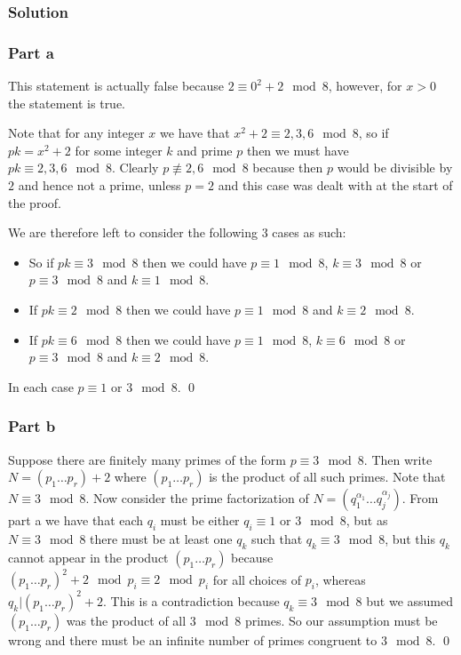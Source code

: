 \documentclass{unswmaths}
\begin{document}
\subsubsection*{Solution}
\subsubsection*{Part a}
This statement is actually false because $ 2 \equiv 0^2 + 2 \mod 8 $, however, for $ x > 0 $ the
statement is true.

Note that for any integer $ x $ we have that $ x^2 + 2 \equiv 2, 3, 6 \mod 8 $,
so if $ pk = x^2 + 2 $ for some integer $ k $ and prime $ p $ then we must have
$ pk \equiv 2,3,6 \mod 8 $. Clearly $ p \not\equiv 2, 6 \mod 8 $ because then $ p $ would
be divisible by $ 2 $ and hence not a prime, unless $ p = 2 $ and this case was dealt with at the start of the proof.

We are therefore left to consider the following 3 cases as such:
\begin{itemize}
	\item So if $ pk \equiv 3 \mod 8 $ then we could have $ p \equiv 1 \mod 8 $, $ k \equiv 3 \mod 8 $ or $ p \equiv 3 \mod 8 $ and $ k \equiv 1 \mod 8 $.

	\item If $ pk \equiv 2 \mod 8 $ then we could have $ p \equiv 1 \mod 8 $ and $ k \equiv 2 \mod 8 $.

	\item If $ pk \equiv 6 \mod 8 $ then we could have $ p \equiv 1 \mod 8 $, $ k \equiv 6 \mod 8 $ or $ p \equiv 3 \mod 8 $ and $ k \equiv 2 \mod 8 $.
\end{itemize}
In each case $ p \equiv 1 $ or $ 3 \mod 8 $. \qed

\subsubsection*{Part b}
Suppose there are finitely many primes of the form $ p \equiv 3 \mod 8 $. Then write $ N = (p_1\ldots p_r) + 2 $ where $ (p_1\ldots p_r) $ is the product of all such primes.
Note that $ N \equiv 3 \mod 8 $. Now consider the prime factorization of $ N = (q_1^{\alpha_1}\ldots q_j^{\alpha_j}) $. From part a we have that 
each $ q_i $ must be either $ q_i \equiv 1 $ or $ 3 \mod 8 $, but as $ N \equiv 3 \mod 8 $ there must be at least one $ q_k $ such that $ q_k \equiv 3 \mod 8 $,
but this $ q_k $ cannot appear in the product $ (p_1\ldots p_r) $ because $ (p_1\ldots p_r)^2 + 2 \mod p_i \equiv 2 \mod p_i $ for all choices of $ p_i $, 
whereas $ q_k | (p_1 \ldots p_r)^2 + 2 $. This is a contradiction because $ q_k \equiv 3 \mod 8 $ but we assumed $ (p_1 \ldots p_r) $ was the product of all $ 3 \mod 8 $ primes.
So our assumption must be wrong and there must be an infinite number of primes congruent to $ 3 \mod 8 $. \qed
\end{document}
